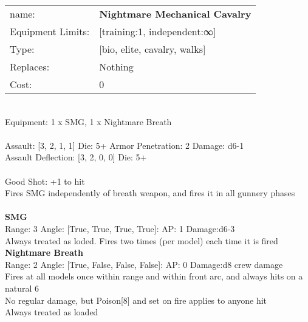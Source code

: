 \noindent
\begin{tabular}{ll}
name: &{\bf Nightmare Mechanical Cavalry } \\
Equipment Limits: &[training:1, independent:∞] \\
Type: &[bio, elite, cavalry, walks] \\
Replaces: &Nothing \\
Cost: & 0\\
\end{tabular}
\ \\
Equipment: 1 x SMG, 1 x Nightmare Breath \\
\ \\
Assault: [3, 2, 1, 1] Die: 5+ Armor Penetration: 2 Damage: d6-1 \\
Assault Deflection: [3, 2, 0, 0] Die: 5+\\
\indent  
\ \\
Good Shot: +1 to hit\\ 
Fires SMG independently of breath weapon, and fires it in all gunnery phases\\ 

\ \\
{\bf SMG } \\



Range: 3  Angle: [True, True, True, True]: AP: 1 Damage:d6-3 \\
Always treated as loded. Fires two times (per model) each time it is fired\\ 




{\bf Nightmare Breath } \\



Range: 2  Angle: [True, False, False, False]: AP: 0 Damage:d8 crew damage \\
Fires at all models once within range and within front arc, and always hits on a natural 6\\ 
No regular damage, but Poison[8] and set on fire applies to anyone hit\\ 
Always treated as loaded\\ 




 
\ \\



